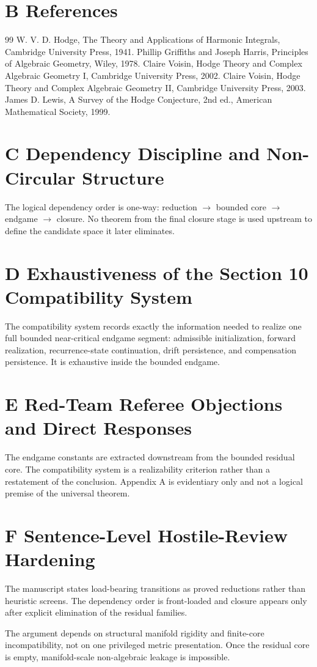 \documentclass[11pt]{article}
\theoremstyle{definition}
\begin{document}
\section*{B References}
\begin{thebibliography}{99}
 W. V. D. Hodge, The Theory and Applications of Harmonic Integrals, Cambridge University Press, 1941.
 Phillip Griffiths and Joseph Harris, Principles of Algebraic Geometry, Wiley, 1978.
 Claire Voisin, Hodge Theory and Complex Algebraic Geometry I, Cambridge University Press, 2002.
 Claire Voisin, Hodge Theory and Complex Algebraic Geometry II, Cambridge University Press, 2003.
 James D. Lewis, A Survey of the Hodge Conjecture, 2nd ed., American Mathematical Society, 1999.
\end{thebibliography}

\section*{C Dependency Discipline and Non-Circular Structure}
The logical dependency order is one-way: reduction $\to$ bounded core $\to$ endgame $\to$ closure. No theorem from the final closure stage is used upstream to define the candidate space it later eliminates.

\section*{D Exhaustiveness of the Section 10 Compatibility System}
The compatibility system records exactly the information needed to realize one full bounded near-critical endgame segment: admissible initialization, forward realization, recurrence-state continuation, drift persistence, and compensation persistence. It is exhaustive inside the bounded endgame.

\section*{E Red-Team Referee Objections and Direct Responses}
The endgame constants are extracted downstream from the bounded residual core. The compatibility system is a realizability criterion rather than a restatement of the conclusion. Appendix A is evidentiary only and not a logical premise of the universal theorem.

\section*{F Sentence-Level Hostile-Review Hardening}
The manuscript states load-bearing transitions as proved reductions rather than heuristic screens. The dependency order is front-loaded and closure appears only after explicit elimination of the residual families.

The argument depends on structural manifold rigidity and finite-core incompatibility, not on one privileged metric presentation. Once the residual core is empty, manifold-scale non-algebraic leakage is impossible.
\end{document}
